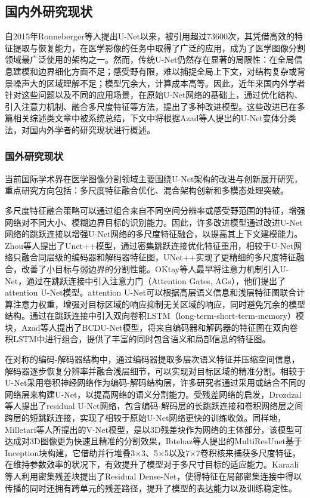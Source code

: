 \subsection{国内外研究现状}

自2015年Ronneberger等人提出U-Net以来，被引用超过73600次，其凭借高效的特征提取与恢复能力，在医学影像的任务中取得了广泛的应用，成为了医学图像分割领域最广泛使用的架构之一。然而，传统U-Net仍然存在显著的局限性：在全局信息建模和边界细化方面不足；感受野有限，难以捕捉全局上下文，对结构复杂或背景噪声大的区域理解不足；模型冗余大，计算成本高等。因此，近年来国内外学者针对这些问题以及不同的应用场景，在原始U-Net网络的基础上，通过优化结构、引入注意力机制、融合多尺度特征等方法，提出了多种改进模型。这些改进已在多篇相关综述类文章中被系统总结\cite{azad2024,krithikaaliasanbudevi2022,wang2023}，下文中将根据Azad等人提出的U-Net变体分类法\cite{azad2024}，对国内外学者的研究现状进行概述。

\subsubsection{国外研究现状}

当前国际学术界在医学图像分割领域主要围绕U-Net架构的改进与创新展开研究，重点研究方向包括：多尺度特征融合优化、混合架构创新和多模态处理突破。

多尺度特征融合策略可以通过组合来自不同空间分辨率或感受野范围的特征，增强网络对不同大小、模糊边界目标的识别能力。因此，许多改进模型通过改进U-Net网络的跳跃连接以增强U-Net网络的多尺度特征融合，以提高其上下文建模能力。Zhou等人\cite{zhou2018}提出了Unet++模型，通过密集跳跃连接优化特征重用，相较于U-Net网络只融合同层级的编码器和解码器特征图，UNet++实现了更精细的多尺度特征融合，改善了小目标与弱边界的分割性能。OKtay等人\cite{oktay2018}最早将注意力机制引入U-Net，通过在跳跃连接中引入注意力门（Attention Gates, AGs），他们提出了attention U-Net模型。attention U-Net可以根据高层语义信息和浅层特征图联合计算注意力权重，增强对目标区域的响应抑制无关区域的响应，同时避免冗余的模型结构。通过在跳跃连接中引入双向卷积LSTM（long-term-short-term-memory）模块，Azad等人\cite{azad2019}提出了BCDU-Net模型，将来自编码器和解码器的特征图在双向卷积LSTM中进行组合，提供了丰富的同时包含语义和局部信息的特征图。

在对称的编码-解码器结构中，通过编码器提取多层次语义特征并压缩空间信息，解码器逐步恢复分辨率并融合浅层细节，可以实现对目标区域的精准分割。相较于U-Net采用卷积神经网络作为编码-解码结构层，许多研究者通过采用或结合不同的网络层来构建U-Net，以提高网络的语义分割能力。受残差网络的启发，Drozdzal等人\cite{drozdzal2016}提出了residual U-Net网络，包含编码-解码层的长跳跃连接和卷积网络层之间跨层的短跳跃连接，实现了相较于原始U-Net网络更快的训练收敛。同样地，Milletari等人\cite{milletari2016}所提出的V-Net模型，是以3D残差块作为网络的主体部分，该模型可达成对3D图像更为快速且精准的分割效果，Ibtehaz等人\cite{ibtehaz2020}提出的MultiResUnet基于Inception块构建，它借助并行堆叠3×3、5×5以及7×7卷积核来捕获多尺度特征，在维持参数效率的状况下，有效提升了模型对于多尺寸目标的适应能力。Karaali等人\cite{karaali2022}利用密集残差块提出了Residual Dense-Net，使得特征在局部密集连接中得以传播的同时还拥有跨单元的残差路径，提升了模型的表达能力以及训练稳定性。

